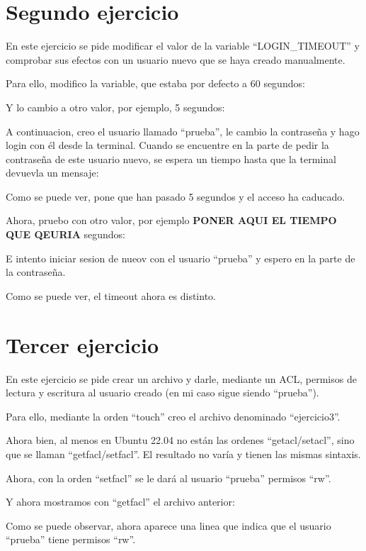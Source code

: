\documentclass{article}
\begin{document}
\section{Segundo ejercicio}
En este ejercicio se pide modificar el valor de la variable ``LOGIN\_TIMEOUT'' y comprobar sus efectos con un usuario nuevo que se haya creado manualmente.

Para ello, modifico la variable, que estaba por defecto a 60 segundos:


Y lo cambio a otro valor, por ejemplo, 5 segundos:


A continuacion, creo el usuario llamado ``prueba'', le cambio la contraseña y hago login con él desde la terminal. Cuando se encuentre en la parte de pedir la contraseña de este usuario nuevo, se espera un tiempo hasta que la terminal devuevla un mensaje:


Como se puede ver, pone que han pasado 5 segundos y el acceso ha caducado.

Ahora, pruebo con otro valor, por ejemplo \textbf{PONER AQUI EL TIEMPO QUE QEURIA} segundos:


E intento iniciar sesion de nueov con el usuario ``prueba'' y espero en la parte de la contraseña.


Como se puede ver, el timeout ahora es distinto.


\section{Tercer ejercicio}
En este ejercicio se pide crear un archivo y darle, mediante un ACL, permisos de lectura y escritura al usuario creado (en mi caso sigue siendo ``prueba'').

Para ello, mediante la orden ``touch'' creo el archivo denominado ``ejercicio3''.

Ahora bien, al menos en Ubuntu 22.04 no están las ordenes ``getacl/setacl'', sino que se llaman ``getfacl/setfacl''. El resultado no varía y tienen las mismas sintaxis.


Ahora, con la orden ``setfacl'' se le dará al usuario ``prueba'' permisos ``rw''.



Y ahora mostramos con ``getfacl'' el archivo anterior:


Como se puede observar, ahora aparece una linea que indica que el usuario ``prueba'' tiene permisos ``rw''.
\end{document}
